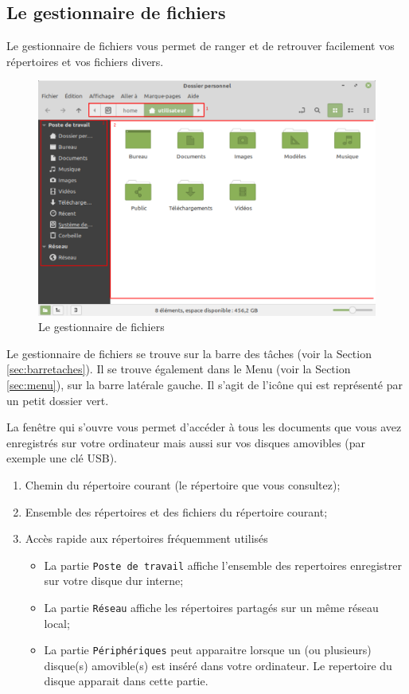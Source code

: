 \documentclass[12pt]{book}
\begin{document}
	\subsection{Le gestionnaire de fichiers}\label{sec:fichiers}
		Le gestionnaire de fichiers vous permet de ranger et de retrouver facilement vos répertoires et vos fichiers divers.
		\begin{figure}[h]
			\centering
			\includegraphics[width=\textwidth]{include/fichiers.png}
			\caption{Le gestionnaire de fichiers}
			\label{fig:fichiers}
		\end{figure}\par
		Le gestionnaire de fichiers se trouve sur la barre des tâches (voir la Section \ref{sec:barretaches}).
		Il se trouve également dans le Menu (voir la Section \ref{sec:menu}), sur la barre latérale gauche.
		Il s'agit de l'icône qui est représenté par un petit dossier vert.\par
		La fenêtre qui s'ouvre vous permet d'accéder à tous les documents que vous avez enregistrés sur votre ordinateur mais aussi sur vos disques amovibles (par exemple une clé USB).
		\begin{enumerate}
			\item Chemin du répertoire courant (le répertoire que vous consultez);
			\item Ensemble des répertoires et des fichiers du répertoire courant;
			\item Accès rapide aux répertoires fréquemment utilisés
			\begin{itemize}
				\item La partie \texttt{Poste de travail} affiche l'ensemble des repertoires enregistrer sur votre disque dur interne;
				\item La partie \texttt{Réseau} affiche les répertoires partagés sur un même réseau local;
				\item La partie \texttt{Périphériques} peut apparaitre lorsque un (ou plusieurs) disque(s) amovible(s) est inséré dans votre ordinateur. Le repertoire du disque apparait dans cette partie.
			\end{itemize}
		\end{enumerate}
\end{document}
